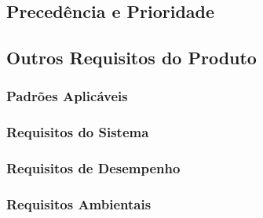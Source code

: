 \subsection{Precedência e Prioridade}

\subsection{Outros Requisitos do Produto}

\subsubsection{Padrões Aplicáveis}

\subsubsection{Requisitos do Sistema}

\subsubsection{Requisitos de Desempenho}

\subsubsection{Requisitos Ambientais}

